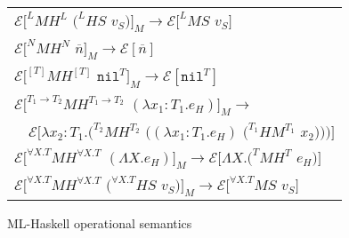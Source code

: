 \begin{figure}[p]
\centering
\begin{tabular}{l}
\vspace{5pt}

$\mathscr{E}[^{L}MH^{L}$ $(^{L}HS$ $v_{S})]_{M}\rightarrow\mathscr{E}[^{L}MS$ $v_{S}]$ \\

\vspace{5pt}

$\mathscr{E}[^{N}MH^{N}$ $\overline{n}]_{M}\rightarrow\mathscr{E}[\overline{n}]$ \\

\vspace{5pt}

$\mathscr{E}[^{[T]}MH^{[T]}$ $\mathtt{nil}^{T}]_{M}\rightarrow\mathscr{E}[\mathtt{nil}^{T}]$ \\

\vspace{5pt}

$\mathscr{E}[^{T_{1}\rightarrow T_{2}}MH^{T_{1}\rightarrow T_{2}}$ $(\lambda x_{1}:T_{1}.e_{H})]_{M}\rightarrow$ \\

\vspace{5pt}

$\quad\mathscr{E}[\lambda x_{2}:T_{1}.(^{T_{2}}MH^{T_{2}}$ $((\lambda x_{1}:T_{1}.e_{H})$ $(^{T_{1}}HM^{T_{1}}$ $x_{2})))]$ \\

\vspace{5pt}

$\mathscr{E}[^{\forall X.T}MH^{\forall X.T}$ $(\Lambda X.e_{H})]_{M}\rightarrow\mathscr{E}[\Lambda X.(^{T}MH^{T}$ $e_{H})]$ \\

\vspace{5pt}

$\mathscr{E}[^{\forall X.T}MH^{\forall X.T}$ $(^{\forall X.T}HS$ $v_{S})]_{M}\rightarrow\mathscr{E}[^{\forall X.T}MS$ $v_{S}]$ \\
\end{tabular}
\caption{ML-Haskell operational semantics}
\label{mhos}
\end{figure}